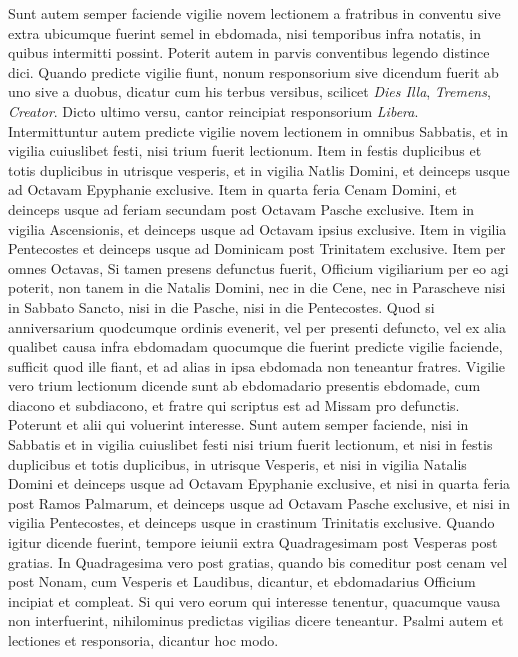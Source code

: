 \begin{multicols*}{2}
Sunt autem semper faciende vigilie novem lectionem a fratribus in conventu sive extra ubicumque fuerint semel in ebdomada, nisi temporibus infra notatis, in quibus intermitti possint. Poterit autem in parvis conventibus legendo distince dici. Quando predicte vigilie fiunt, nonum responsorium sive dicendum fuerit ab uno sive a duobus, dicatur cum his terbus versibus, scilicet \textit{Dies Illa}, \textit{Tremens}, \textit{Creator}. Dicto ultimo versu, cantor reincipiat responsorium \textit{Libera}.
Intermittuntur autem predicte vigilie novem lectionem in omnibus Sabbatis, et in vigilia cuiuslibet festi, nisi trium fuerit lectionum. Item in festis duplicibus et totis duplicibus in utrisque vesperis, et in vigilia Natlis Domini, et deinceps usque ad Octavam Epyphanie exclusive. Item in quarta feria Cenam Domini, et deinceps usque ad feriam secundam post Octavam Pasche exclusive. Item in vigilia Ascensionis, et deinceps usque ad Octavam ipsius exclusive. Item in vigilia Pentecostes et deinceps usque ad Dominicam post Trinitatem exclusive. Item per omnes Octavas, Si tamen presens defunctus fuerit, Officium vigiliarium per eo agi poterit, non tanem in die Natalis Domini, nec in die Cene, nec in Parascheve nisi in Sabbato Sancto, nisi in die Pasche, nisi in die Pentecostes.
Quod si anniversarium quodcumque ordinis evenerit, vel per presenti defuncto, vel ex alia qualibet causa infra ebdomadam quocumque die fuerint predicte vigilie faciende, sufficit quod ille fiant, et ad alias in ipsa ebdomada non teneantur fratres.
Vigilie vero trium lectionum dicende sunt ab ebdomadario presentis ebdomade, cum diacono et subdiacono, et fratre qui scriptus est ad Missam pro defunctis. Poterunt et alii qui voluerint interesse. Sunt autem semper faciende, nisi in Sabbatis et in vigilia cuiuslibet festi nisi trium fuerit lectionum, et nisi in festis duplicibus et totis duplicibus, in utrisque Vesperis, et nisi in vigilia Natalis Domini et deinceps usque ad Octavam Epyphanie exclusive, et nisi in quarta feria post Ramos Palmarum, et deinceps usque ad Octavam Pasche exclusive, et nisi in vigilia Pentecostes, et deinceps usque in crastinum Trinitatis exclusive.
Quando igitur dicende fuerint, tempore ieiunii extra Quadragesimam post Vesperas post gratias. In Quadragesima vero post gratias, quando bis comeditur post cenam vel post Nonam, cum Vesperis et Laudibus, dicantur, et ebdomadarius Officium incipiat et compleat. Si qui vero eorum qui interesse tenentur, quacumque vausa non interfuerint, nihilominus predictas vigilias dicere teneantur. Psalmi autem et lectiones et responsoria, dicantur hoc modo.

\end{multicols*}
